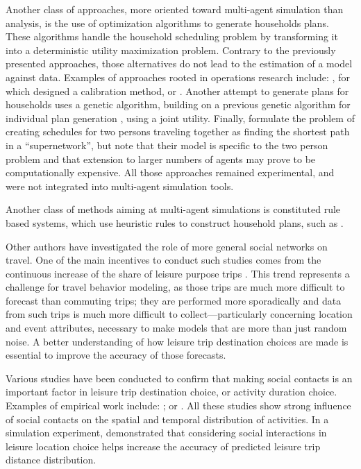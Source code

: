 {Another class of approaches, more oriented toward multi-agent simulation than analysis, is the use of optimization algorithms to generate households plans. These algorithms handle the household scheduling problem by transforming it into a deterministic utility maximization problem. Contrary to the previously presented approaches, those alternatives do not lead to the estimation of a model against data. Examples of approaches rooted in operations research include: \citet{Recker_TRR_1995}, for which \citet{ChowRecker_TranResB_2012} designed a calibration method, or \citet{GanRecker_TransResB_2008}. Another attempt to generate plans for households uses a genetic algorithm, building on a previous genetic algorithm for individual plan generation \citep{CharyparNagel2005ga4acts, MeisterEtAl_Transportation_2005}, using a joint utility. Finally, \citet{LiaoFEtAl_Transportation_2013} formulate the problem of creating schedules for two persons traveling together as finding the shortest path in a ``supernetwork'', but note that their model is specific to the two person problem and that extension to larger numbers of agents may prove to be computationally expensive. All those approaches remained experimental, and were not integrated into multi-agent simulation tools.

Another class of methods aiming at multi-agent simulations is constituted rule based systems, which use heuristic rules to construct household plans, such as \citet{MillerEtAl_Transportation_2005, ArentzeTimmermans_TransResB_2009}.

Other authors have investigated the role of more general social networks on travel. One of the main incentives to conduct such studies comes from the continuous increase of the share of leisure purpose trips  \citep{SchlichEtAl_TransportRev_2004,Axhausen_DonaghyEtAl_2005}. This trend represents a challenge for travel behavior modeling, as those trips are much more difficult to forecast than commuting trips; they are performed more sporadically and data from such trips is much more difficult to collect---particularly concerning location and event attributes, necessary to make models that are more than just random noise. A better understanding of how leisure trip destination choices are made is essential to improve the accuracy of those forecasts.

Various studies have been conducted to confirm that making social contacts is an important factor in leisure trip destination choice, or activity duration choice. Examples of empirical work include: \citet{CarrascoJAHabib_IATBR_2009}; \citet{HabibCarrascoJA_TRR_2011} or \citet{MooreJEtAl_Transportation_2013}. All these studies show strong influence of social contacts on the spatial and temporal distribution of activities. In a simulation experiment, \citet{Frei_PhDThesis_2012} demonstrated that considering social interactions in leisure location choice helps increase the accuracy of predicted leisure trip distance distribution.

}
